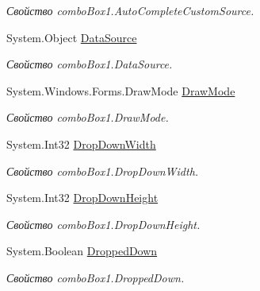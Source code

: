 \begin{DoxyCompactItemize}
\begin{DoxyCompactList}\small\item\em Свойство combo\+Box1.\+Auto\+Complete\+Custom\+Source. \end{DoxyCompactList}\item 
System.\+Object \mbox{\hyperlink{class_f_b_a_1_1_sys_d_b_edit_a84a3fd381f6d1e1c573de118ae14c021}{Data\+Source}}
\begin{DoxyCompactList}\small\item\em Свойство combo\+Box1.\+Data\+Source. \end{DoxyCompactList}\item 
System.\+Windows.\+Forms.\+Draw\+Mode \mbox{\hyperlink{class_f_b_a_1_1_sys_d_b_edit_a3cee86c798ab7d85af90e150b6f0b5db}{Draw\+Mode}}
\begin{DoxyCompactList}\small\item\em Свойство combo\+Box1.\+Draw\+Mode. \end{DoxyCompactList}\item 
System.\+Int32 \mbox{\hyperlink{class_f_b_a_1_1_sys_d_b_edit_a12bdaf101e742729cd6854886a01c92a}{Drop\+Down\+Width}}
\begin{DoxyCompactList}\small\item\em Свойство combo\+Box1.\+Drop\+Down\+Width. \end{DoxyCompactList}\item 
System.\+Int32 \mbox{\hyperlink{class_f_b_a_1_1_sys_d_b_edit_adfeeab974c8b58ecb995e38e8f700d6c}{Drop\+Down\+Height}}
\begin{DoxyCompactList}\small\item\em Свойство combo\+Box1.\+Drop\+Down\+Height. \end{DoxyCompactList}\item 
System.\+Boolean \mbox{\hyperlink{class_f_b_a_1_1_sys_d_b_edit_a05b11f1697ac5dff66d7b7f13820f8ad}{Dropped\+Down}}
\begin{DoxyCompactList}\small\item\em Свойство combo\+Box1.\+Dropped\+Down. \end{DoxyCompactList}\item 

\end{DoxyCompactItemize}
